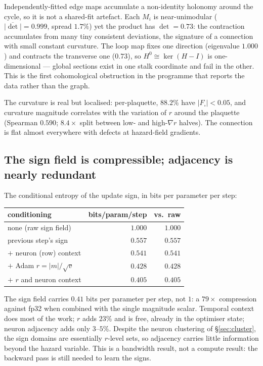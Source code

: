 \begin{proposition}
Independently-fitted edge maps accumulate a non-identity holonomy around the
cycle, so it is not a shared-fit artefact. Each $M_i$ is near-unimodular
($\overline{|\det|}=0.999$, spread $1.7\%$) yet the product has $\det=0.73$: the
contraction accumulates from many tiny consistent deviations, the signature of a
connection with small constant curvature. The loop map fixes one direction
(eigenvalue $1.000$) and contracts the transverse one ($0.73$), so
$H^0\cong\ker(H-I)$ is one-dimensional --- global sections exist in one stalk
coordinate and fail in the other. This is the first cohomological obstruction in
the programme that reports the data rather than the graph.
\end{proposition}

The curvature is real but localised: per-plaquette, $88.2\%$ have
$|F_\square|<0.05$, and curvature magnitude correlates with the variation of $r$
around the plaquette (Spearman $0.590$; $8.4\times$ split between low- and
high-$\nabla r$ halves). The connection is flat almost everywhere with defects
at hazard-field gradients.

\subsection{The sign field is compressible; adjacency is nearly redundant}
\label{sec:signentropy}

The conditional entropy of the update sign, in bits per parameter per step:

\begin{center}
\begin{tabular}{lrr}
\toprule
conditioning & bits/param/step & vs.\ raw \\
\midrule
none (raw sign field) & $1.000$ & $1.000$ \\
previous step's sign & $0.557$ & $0.557$ \\
$+$ neuron (row) context & $0.541$ & $0.541$ \\
$+$ Adam $r=|m|/\sqrt{v}$ & $0.428$ & $0.428$ \\
$+$ $r$ and neuron context & $0.405$ & $0.405$ \\
\bottomrule
\end{tabular}
\end{center}

The sign field carries $0.41$ bits per parameter per step, not $1$: a
$79\times$ compression against fp32 when combined with the single magnitude
scalar. Temporal context does most of the work; $r$ adds $23\%$ and is free,
already in the optimiser state; neuron adjacency adds only $3$--$5\%$. Despite
the neuron clustering of \S\ref{sec:cluster}, the sign domains are essentially
$r$-level sets, so adjacency carries little information beyond the hazard
variable. This is a bandwidth result, not a compute result: the backward pass
is still needed to learn the signs.

